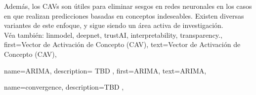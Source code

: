 {{Además, los CAVs son útiles para eliminar sesgos en redes neuronales en los casos en que realizan predicciones basadas en conceptos indeseables. Existen diversas variantes de este enfoque, y sigue siendo un área activa de investigación.  
				\\
		 Véa también: \gls{linmodel}, \gls{deepnet}, \gls{trustAI}, \gls{interpretability}, \gls{transparency}.}, 
	first={Vector de Activación de Concepto (CAV)},
	text={Vector de Activación de Concepto (CAV)}, 
}


{name={ARIMA},
	description={ TBD
}, 
	first={ARIMA},
	text={ARIMA}, 
}

{name={convergence},
	description={TBD , 
}}
